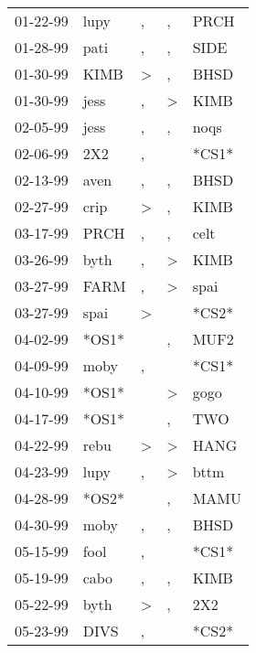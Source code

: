 \begin{supertabular}{lllll}
 01-22-99 &   lupy &                , &                , &   PRCH \\
 01-28-99 &   pati &                , &                , &   SIDE \\
 01-30-99 &   KIMB &     \textgreater &                , &   BHSD \\
 01-30-99 &   jess &                , &     \textgreater &   KIMB \\
 02-05-99 &   jess &                , &                , &   noqs \\
 02-06-99 &    2X2 &                , &                  &  *CS1* \\
 02-13-99 &   aven &                , &                , &   BHSD \\
 02-27-99 &   crip &     \textgreater &                , &   KIMB \\
 03-17-99 &   PRCH &                , &                , &   celt \\
 03-26-99 &   byth &                , &     \textgreater &   KIMB \\
 03-27-99 &   FARM &                , &     \textgreater &   spai \\
 03-27-99 &   spai &     \textgreater &                  &  *CS2* \\
 04-02-99 &  *OS1* &                  &                , &   MUF2 \\
 04-09-99 &   moby &                , &                  &  *CS1* \\
 04-10-99 &  *OS1* &                  &     \textgreater &   gogo \\
 04-17-99 &  *OS1* &                  &                , &    TWO \\
 04-22-99 &   rebu &     \textgreater &     \textgreater &   HANG \\
 04-23-99 &   lupy &                , &     \textgreater &   bttm \\
 04-28-99 &  *OS2* &                  &                , &   MAMU \\
 04-30-99 &   moby &                , &                , &   BHSD \\
 05-15-99 &   fool &                , &                  &  *CS1* \\
 05-19-99 &   cabo &                , &                , &   KIMB \\
 05-22-99 &   byth &     \textgreater &                , &    2X2 \\
 05-23-99 &   DIVS &                , &                  &  *CS2* \\

\end{supertabular}

